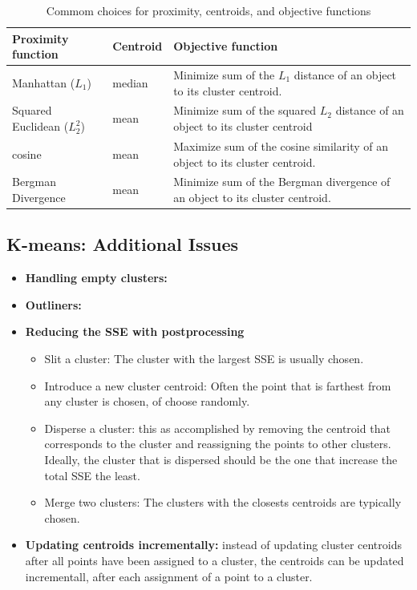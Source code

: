 		\begin{table}[H]
			\begin{tabular}{| l | l | p{8cm} |}
				\hline
				{\bf Proximity function} & {\bf Centroid} & {\bf Objective function} \\ \hline
				Manhattan ($L_{1}$) & median
				& Minimize sum of the $L_{1}$ distance of an object to its cluster centroid. \\ \hline
				Squared Euclidean ($L_{2}^{2}$) & mean
				& Minimize sum of the squared $L_{2}$ distance of an object to its cluster centroid \\ \hline
				cosine & mean 
				& Maximize sum of the cosine similarity of an object to its cluster centroid. \\ \hline
				Bergman Divergence & mean &
				Minimize sum of the Bergman divergence of an object to its cluster centroid. \\ \hline
			\end{tabular}
			\caption{Commom choices for proximity, centroids, and objective functions}
		\end{table}

		\subsection{K-means: Additional Issues}
			\begin{itemize}
				\item {\bf Handling empty clusters:}
				\item {\bf Outliners:}
				\item {\bf Reducing the SSE with postprocessing}
					\begin{itemize}
						\item Slit a cluster: The cluster with the largest SSE is usually chosen.
						\item Introduce a new cluster centroid: Often the point that is farthest from
						any cluster is chosen, of choose randomly. 
						\item Disperse a cluster: this as accomplished by removing the centroid that
						corresponds to the cluster and reassigning the points to other clusters. 
						Ideally, the cluster that is dispersed should be the one that increase the
						total SSE the least. 
						\item Merge two clusters: The clusters with the closests centroids are 
						typically chosen.
					\end{itemize}
				\item {\bf Updating centroids incrementally:} instead of updating cluster centroids
				after all points have been assigned to a cluster, the centroids can be updated
				incrementall, after each assignment of a point to a cluster. 
			\end{itemize}

